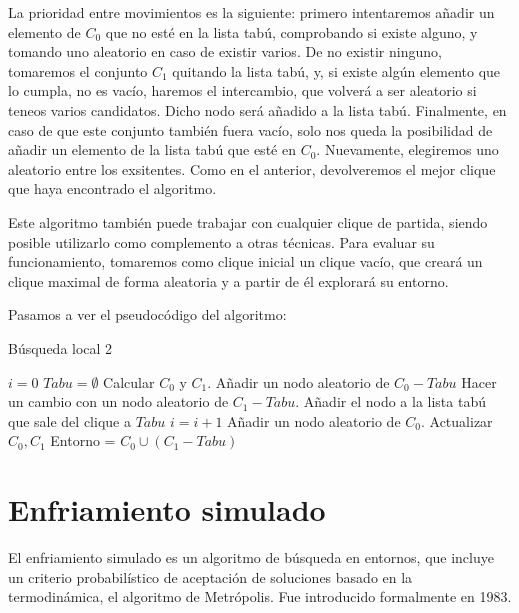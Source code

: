 La prioridad entre movimientos es la siguiente: primero intentaremos añadir un elemento de
$C_0$ que no esté en la lista tabú, comprobando si existe alguno, y tomando uno aleatorio
en caso de existir varios. De no existir ninguno, tomaremos el conjunto $C_1$ quitando
la lista tabú, y, si existe algún elemento que lo cumpla, no es vacío, haremos el intercambio,
que volverá a ser aleatorio si teneos varios candidatos. Dicho nodo será añadido a la lista tabú.
Finalmente, en caso de que este conjunto también fuera vacío, solo nos queda la posibilidad de añadir un
elemento de la lista tabú que esté en $C_0$. Nuevamente, elegiremos uno aleatorio entre los exsitentes.
Como en el anterior, devolveremos el mejor clique que haya encontrado el algoritmo.

Este algoritmo también puede trabajar con cualquier clique de partida, siendo posible utilizarlo como
complemento a otras técnicas. Para evaluar su funcionamiento, tomaremos como clique inicial un clique
vacío, que creará un clique maximal de forma aleatoria y a partir de él explorará su entorno.

Pasamos a ver el pseudocódigo del algoritmo:

\begin{algorithm}[H]
\caption{Búsqueda local 2}
  \begin{algorithmic}
    \State $i = 0$
    \State $Tabu = \emptyset$
    \State Calcular $C_0$ y $C_1$.
    \Repeat
        \State Añadir un nodo aleatorio de $C_0 - Tabu$
        \State Hacer un cambio con un nodo aleatorio de $C_1 - Tabu$.
        \State Añadir el nodo a la lista tabú que sale del clique a $Tabu$
        \State $i = i + 1$
        \State Añadir un nodo aleatorio de $C_0$.
      \EndIf
      \State Actualizar $C_0, C_1$
      \State Entorno = $C_0 \cup (C_1 - Tabu)$
  \end{algorithmic}
\end{algorithm}

\section{Enfriamiento simulado}

El enfriamiento simulado es un algoritmo de búsqueda en entornos, que incluye un criterio probabilístico
de aceptación de soluciones basado en la termodinámica, el algoritmo de Metrópolis. Fue introducido formalmente en 1983.

